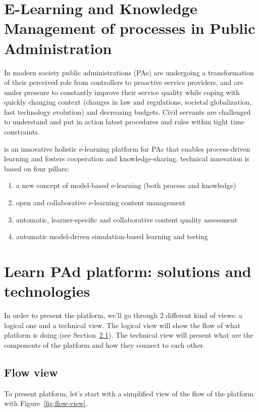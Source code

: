 \documentclass{learnpad}
\begin{document}
\chapter{E-Learning and Knowledge Management of processes in Public Administration}
\label{ch:intro}
In modern society public administrations (PAs) are undergoing a transformation
of their perceived role from controllers to proactive service providers, and are
under pressure to constantly improve their service quality while coping with
quickly changing context (changes in law and regulations, societal
globalization, fast technology evolution) and decreasing budgets.  Civil
servants are challenged to understand and put in action latest procedures and
rules within tight time constraints.

\learnpad is an innovative holistic e-learning platform for PAs that enables
process-driven learning and fosters cooperation and knowledge-sharing.
\learnpad technical innovation is based on four pillars:
\begin{enumerate}
	\item a new concept of model-based e-learning (both process and knowledge)
	\item open and collaborative e-learning content management
	\item automatic, learner-specific and collaborative content quality assessment
	\item automatic model-driven simulation-based learning and testing
\end{enumerate}

\chapter{Learn PAd platform: solutions and technologies}
\label{ch:platform}
In order to present the platform, we'll go through 2 different kind of views: a
logical one and a technical view.  The logical view will show the flow of what
\learnpad platform is doing (see Section~\ref{sec:flow-view}).  The technical
view will present what are the components of the \learnpad platform and how they
connect to each other.

\section{Flow view}
\label{sec:flow-view}
To present \learnpad platform, let's start with a simplified view of the flow of
the \learnpad platform with Figure~\ref{fig:flow-view}.
\end{document}
